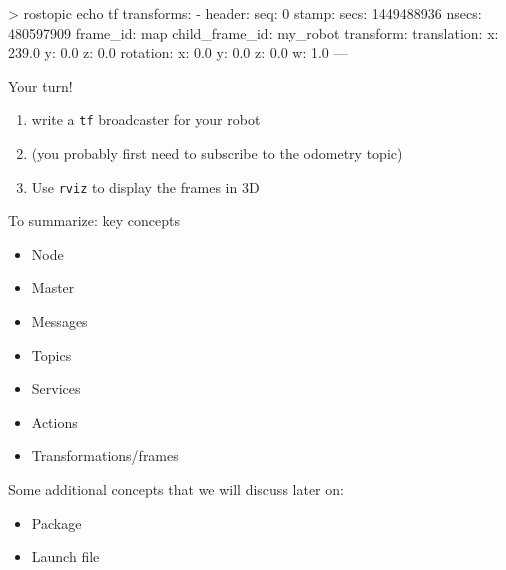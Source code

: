 \documentclass[compress]{beamer}
\begin{document}
%
%
%
%

\begin{frame}[containsverbatim]{}
\begin{shcode}
> rostopic echo tf
transforms: 
  - 
    header: 
      seq: 0
      stamp: 
        secs: 1449488936
        nsecs: 480597909
      frame_id: map
    child_frame_id: my_robot
    transform: 
      translation: 
        x: 239.0
        y: 0.0
        z: 0.0
      rotation: 
        x: 0.0
        y: 0.0
        z: 0.0
        w: 1.0
---

\end{shcode}

\end{frame}

\begin{frame}[plain]{}
    \begin{center}
        \Large
        Your turn!

        \begin{enumerate}
            \item write a \texttt{tf} broadcaster for your robot
            \item \small{(you probably first need to subscribe to the odometry
                topic)}
            \item Use \texttt{rviz} to display the frames in 3D

        \end{enumerate}
    \end{center}
\end{frame}


\begin{frame}{To summarize: key concepts}
    \begin{itemize}
        \item Node
        \item Master
        \item Messages
        \item Topics
        \item Services
        \item Actions
        \item Transformations/frames
    \end{itemize}

    \pause

    Some additional concepts that we will discuss later on:
    \begin{itemize}
        \item Package
        \item Launch file
    \end{itemize}
\end{frame}
\end{document}
